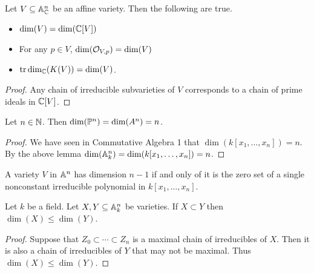 \documentclass[a4paper]{article}
\begin{document}
\begin{prp}{}{} Let $V\subseteq\mathbb{A}_{\mathbb{C}}^n$ be an affine variety. Then the following are true. 
\begin{itemize}
\item $\dim(V)=\dim(\mathbb{C}[V])$
\item For any $p\in V$, $\dim(\mathcal{O}_{V,p})=\dim(V)$
\item $\text{tr}\dim_{\mathbb{C}}(K(V))=\dim(V)$. 
\end{itemize} \tcbline
\begin{proof}
Any chain of irreducible subvarieties of $V$ corresponds to a chain of prime ideals in $\mathbb{C}[V]$. 
\end{proof}
\end{prp}

\begin{lmm}{}{} Let $n\in\mathbb{N}$. Then $\dim(\mathbb{P}^n)=\dim(A^n)=n$. \tcbline
\begin{proof}
We have seen in Commutative Algebra 1 that $\dim(k[x_1,\dots,x_n])=n$. By the above lemma $\dim(\mathbb{A}_k^n)=\dim(k[x_1,\dots,x_n])=n$. 
\end{proof}
\end{lmm}

\begin{prp}{}{} A variety $V$ in $\mathbb{A}^n$ has dimension $n-1$ if and only of it is the zero set of a single nonconstant irreducible polynomial in $k[x_1,\dots,x_n]$. 
\end{prp}

\begin{lmm}{}{} Let $k$ be a field. Let $X,Y\subseteq\mathbb{A}_k^n$ be varieties. If $X\subset Y$ then $\dim(X)\leq\dim(Y)$. \tcbline
\begin{proof}
Suppose that $Z_0\subset\cdots\subset Z_n$ is a maximal chain of irreducibles of $X$. Then it is also a chain of irreducibles of $Y$ that may not be maximal. Thus $\dim(X)\leq\dim(Y)$. 
\end{proof}
\end{lmm}
\end{document}
